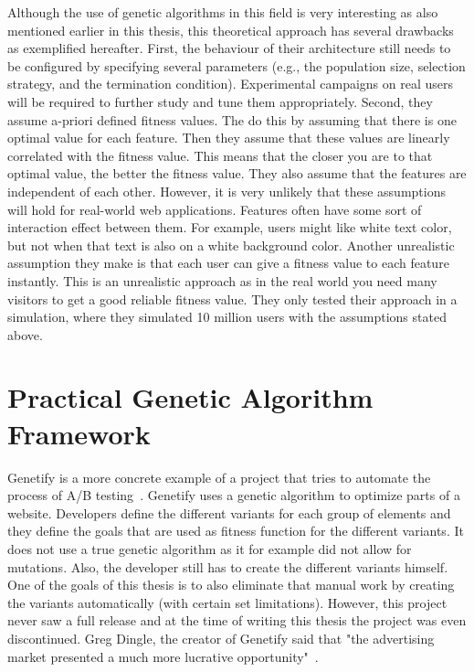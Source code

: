 \documentclass{report}
\begin{document}
Although the use of genetic algorithms in this field is very interesting as also mentioned earlier in this thesis, this theoretical approach has several drawbacks as exemplified hereafter. First, the behaviour of their architecture still needs to be configured by specifying several parameters (e.g., the population size, selection strategy, and the termination condition). Experimental campaigns on real users will be required to further study and tune them appropriately. Second, they assume a-priori defined fitness values. The do this by assuming that there is one optimal value for each feature. Then they assume that these values are linearly correlated with the fitness value. This means that the closer you are to that optimal value, the better the fitness value. They also assume that the features are independent of each other. However, it is very unlikely that these assumptions will hold for real-world web applications. Features often have some sort of interaction effect between them. For example, users might like white text color, but not when that text is also on a white background color. Another unrealistic assumption they make is that each user can give a fitness value to each feature instantly. This is an unrealistic approach as in the real world you need many visitors to get a good reliable fitness value. They only tested their approach in a simulation, where they simulated 10 million users with the assumptions stated above.\\

\FloatBarrier
\section{Practical Genetic Algorithm Framework}
Genetify is a more concrete example of a project that tries to automate the process of A/B testing~\cite{genetify}. Genetify uses a genetic algorithm to optimize parts of a website. Developers define the different variants for each group of elements and they define the goals that are used as fitness function for the different variants. It does not use a true genetic algorithm as it for example did not allow for mutations. Also, the developer still has to create the different variants himself. One of the goals of this thesis is to also eliminate that manual work by creating the variants automatically (with certain set limitations). However, this project never saw a full release and at the time of writing this thesis the project was even discontinued. Greg Dingle, the creator of Genetify said that "the advertising market presented a much more lucrative opportunity"~\cite{genetifyquote}.\\
\end{document}
